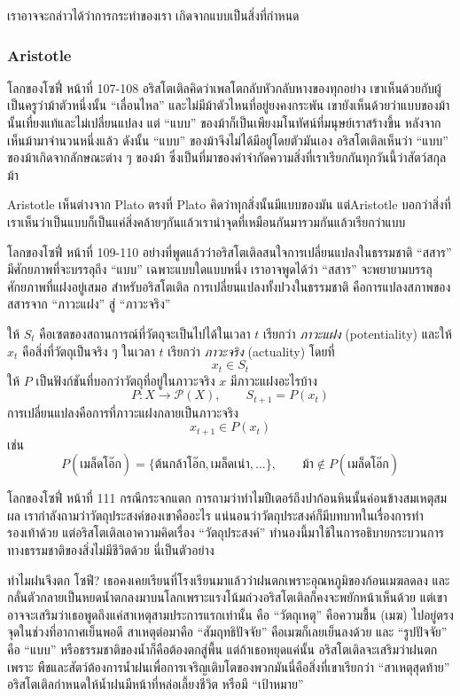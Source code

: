 เราอาจจะกล่าวได้ว่าการกระทำของเรา เกิดจากแบบเป็นสิ่งที่กำหนด

\subsubsection{Aristotle}

\begin{bookquote}{โลกของโซฟี่ หน้าที่ 107-108}
อริสโตเติลคิดว่าเพลโตกลับหัวกลับหางของทุกอย่าง เขาเห็นด้วยกับผู้เป็นครูว่าม้าตัวหนึ่งนั้น “เลื่อนไหล” และไม่มีม้าตัวไหนที่อยู่ยงคงกระพัน เขายังเห็นด้วยว่าแบบของม้านั้นเที่ยงแท้และไม่เปลี่ยนแปลง แต่ “แบบ” ของม้าก็เป็นเพียงมโนทัศน์ที่มนุษย์เราสร้างขึ้น หลังจาก เห็นม้ามาจำนวนหนึ่งแล้ว ดังนั้น “แบบ” ของม้าจึงไม่ได้มีอยู่โดยตัวมันเอง อริสโตเติลเห็นว่า “แบบ” ของม้าเกิดจากลักษณะต่าง ๆ ของม้า ซึ่งเป็นที่มาของคำจำกัดความสิ่งที่เราเรียกกันทุกวันนี้ว่าสัตว์สกุลม้า
\end{bookquote}

Aristotle เห็นต่างจาก Plato ตรงที่ Plato คิดว่าทุกสิ่งนั้นมีแบบของมัน แต่Aristotle บอกว่าสิ่งที่เราเห็นว่าเป็นแบบก็เป็นแค่สิ่งคล้ายๆกันแล้วเรานำจุดที่เหมือนกันมารวมกันแล้วเรียกว่าแบบ

\begin{bookquote}{โลกของโซฟี่ หน้าที่ 109-110}
อย่างที่พูดแล้วว่าอริสโตเติลสนใจการเปลี่ยนแปลงในธรรมชาติ “สสาร” มีศักยภาพที่จะบรรลุถึง “แบบ” เฉพาะแบบใดแบบหนึ่ง เราอาจพูดได้ว่า “สสาร” จะพยายามบรรลุศักยภาพที่แฝงอยู่เสมอ สำหรับอริสโตเติล การเปลี่ยนแปลงทั้งปวงในธรรมชาติ คือการแปลงสภาพของสสารจาก “ภาวะแฝง” สู่ “ภาวะจริง”
\end{bookquote}

ให้ $S_t$ คือเซตของสถานการณ์ที่วัตถุจะเป็นไปได้ในเวลา $t$ เรียกว่า \textit{ภาวะแฝง} (potentiality) และให้ $x_t$ คือสิ่งที่วัตถุเป็นจริง ๆ ในเวลา $t$ เรียกว่า \textit{ภาวะจริง} (actuality) โดยที่
\[
x_t \in S_t
\]
ให้ $P$ เป็นฟังก์ชันที่บอกว่าวัตถุที่อยู่ในภาวะจริง $x$ มีภาวะแฝงอะไรบ้าง
\[
P : X \to \mathcal{P}(X), \qquad S_{t+1} = P(x_t)
\]
การเปลี่ยนแปลงคือการที่ภาวะแฝงกลายเป็นภาวะจริง
\[
x_{t+1} \in P(x_t)
\]
เช่น
\[
P(\text{เมล็ดโอ๊ก}) = \{\text{ต้นกล้าโอ๊ก}, \text{เมล็ดเน่า}, \dots\}, \qquad \text{ม้า} \notin P(\text{เมล็ดโอ๊ก})
\]

\begin{bookquote}{โลกของโซฟี่ หน้าที่ 111}
กรณีกระจกแตก การถามว่าทำไมปีเตอร์ถึงปาก้อนหินนั้นค่อนข้างสมเหตุสมผล เรากำลังถามว่าวัตถุประสงค์ของเขาคืออะไร แน่นอนว่าวัตถุประสงค์ก็มีบทบาทในเรื่องการทำรองเท้าด้วย แต่อริสโตเติลเอาความคิดเรื่อง “วัตถุประสงค์” ทำนองนี้มาใช้ในการอธิบายกระบวนการทางธรรมชาติของสิ่งไม่มีชีวิตด้วย นี่เป็นตัวอย่าง

ทำไมฝนจึงตก โซฟี? เธอคงเคยเรียนที่โรงเรียนมาแล้วว่าฝนตกเพราะอุณหภูมิของก้อนเมฆลดลง และกลั่นตัวกลายเป็นหยดน้ำตกลงมาบนโลกเพราะแรงโน้มถ่วงอริสโตเติลก็คงจะพยักหน้าเห็นด้วย แต่เขาอาจจะเสริมว่าเธอพูดถึงแค่สาเหตุสามประการแรกเท่านั้น คือ “วัตถุเหตุ” คือความชื้น (เมฆ) ไปอยู่ตรงจุดในช่วงที่อากาศเย็นพอดี สาเหตุต่อมาคือ “สัมฤทธิปัจจัย” คือเมฆก็เลยเย็นลงด้วย และ “รูปปัจจัย” คือ “แบบ” หรือธรรมชาติของน้ำก็คือต้องตกสู่พื้น แต่ถ้าเธอหยุดแค่นั้น อริสโตเติลจะเสริมว่าฝนตก เพราะ พืชและสัตว์ต้องการน้ำฝนเพื่อการเจริญเติบโตของพวกมันนี่คือสิ่งที่เขาเรียกว่า “สาเหตุสุดท้าย” อริสโตเติลกำหนดให้น้ำฝนมีหน้าที่หล่อเลี้ยงชีวิต หรือมี “เป้าหมาย”
\end{bookquote}

